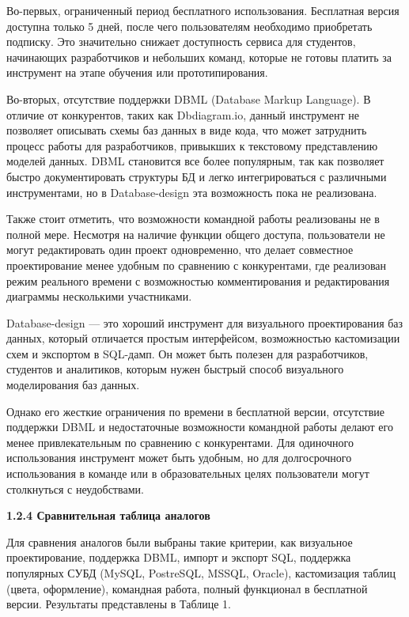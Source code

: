 Во-первых, ограниченный период бесплатного использования. Бесплатная версия доступна только 5 дней, после чего пользователям необходимо приобретать подписку. Это значительно снижает доступность сервиса для студентов, начинающих разработчиков и небольших команд, которые не готовы платить за инструмент на этапе обучения или прототипирования.

Во-вторых, отсутствие поддержки DBML (Database Markup Language). В отличие от конкурентов, таких как Dbdiagram.io, данный инструмент не позволяет описывать схемы баз данных в виде кода, что может затруднить процесс работы для разработчиков, привыкших к текстовому представлению моделей данных. DBML становится все более популярным, так как позволяет быстро документировать структуры БД и легко интегрироваться с различными инструментами, но в Database-design эта возможность пока не реализована.

Также стоит отметить, что возможности командной работы реализованы не в полной мере. Несмотря на наличие функции общего доступа, пользователи не могут редактировать один проект одновременно, что делает совместное проектирование менее удобным по сравнению с конкурентами, где реализован режим реального времени с возможностью комментирования и редактирования диаграммы несколькими участниками.

Database-design — это хороший инструмент для визуального проектирования баз данных, который отличается простым интерфейсом, возможностью кастомизации схем и экспортом в SQL-дамп. Он может быть полезен для разработчиков, студентов и аналитиков, которым нужен быстрый способ визуального моделирования баз данных.

Однако его жесткие ограничения по времени в бесплатной версии, отсутствие поддержки DBML и недостаточные возможности командной работы делают его менее привлекательным по сравнению с конкурентами. Для одиночного использования инструмент может быть удобным, но для долгосрочного использования в команде или в образовательных целях пользователи могут столкнуться с неудобствами.

\textbf{\large 1.2.4 Сравнительная таблица аналогов}

Для сравнения аналогов были выбраны такие критерии, как визуальное проектирование, поддержка DBML, импорт и экспорт SQL, поддержка популярных СУБД (MySQL, PostreSQL, MSSQL, Oracle), кастомизация таблиц (цвета, оформление), командная работа, полный функционал в бесплатной версии. Результаты представлены в Таблице 1.

